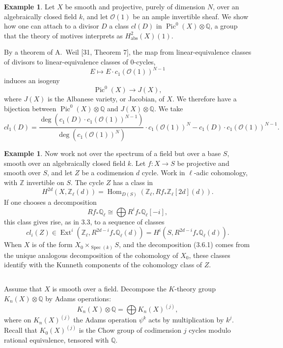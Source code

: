 \documentclass[11pt,a4paper]{article}
\theoremstyle{plain}
\theoremstyle{definition}
\newtheorem{example}[theorem]{Example}
\DeclareMathOperator{\Ext}{Ext}
\DeclareMathOperator{\Hom}{Hom}
\DeclareMathOperator{\Spec}{Spec}
\DeclareMathOperator{\Pic}{Pic}
\newcommand{\Q}{\mathbb{Q}}
\newcommand{\Z}{\mathbb{Z}}
\newcommand{\abs}{\mathrm{abs}}
\begin{document}
\begin{example}
Let $X$ be smooth and projective, purely of dimension $N$, over an algebraically closed field $k$, and let $\mathcal{O}(1)$ be an ample invertible sheaf. We show how one can attach to a divisor $D$ a class $cl(D)$ in $\Pic^0(X)\otimes\Q$, a group that the theory of motives interprets as $H^2_{\abs}(X)(1)$.

By a theorem of A.~Weil [31, Theorem 7], the map from linear-equivalence classes of divisors to linear-equivalence classes of $0$-cycles,
$$
E\mapsto E\cdot c_1(\mathcal{O}(1))^{N-1}
$$
induces an isogeny
$$
\Pic^0(X)\to J(X),
$$
where $J(X)$ is the Albanese variety, or Jacobian, of $X$. We therefore have a bijection between $\Pic^0(X)\otimes\Q$ and $J(X)\otimes\Q$. We take
$$
cl_1(D)=\frac{\deg(c_1(D)\cdot c_1(\mathcal{O}(1))^{N-1})}{\deg(c_1(\mathcal{O}(1))^N)}\cdot c_1(\mathcal{O}(1))^N-c_1(D)\cdot c_1(\mathcal{O}(1))^{N-1}.
$$
\end{example}

\begin{example}
Now work not over the spectrum of a field but over a base $S$, smooth over an algebraically closed field $k$. Let $f:X\to S$ be projective and smooth over $S$, and let $Z$ be a codimension $d$ cycle. Work in $\ell$-adic cohomology, with $\Z$ invertible on $S$. The cycle $Z$ has a class in
$$
H^{2d}(X,\Z_\ell(d))=\Hom_{D(S)}(\Z_\ell,Rf_*\Z_\ell[2d](d)).
$$
If one chooses a decomposition
\begin{equation}
\tag{3.6.1}
Rf_*\Q_\ell\cong\bigoplus R^i f_*\Q_\ell[-i],
\end{equation}
this class gives rise, as in 3.3, to a sequence of classes
\begin{equation}
\tag{3.6.2}
cl_i(Z)\in\Ext^i(\Z_\ell,R^{2d-i}f_*\Q_\ell(d))=H^i(S,R^{2d-i}f_*\Q_\ell(d)).
\end{equation}
When $X$ is of the form $X_0\times_{\Spec(k)}S$, and the decomposition (3.6.1) comes from the unique analogous decomposition of the cohomology of $X_0$, these classes identify with the Kunneth components of the cohomology class of $Z$.
\end{example}

\subsection{}

Assume that $X$ is smooth over a field. Decompose the $K$-theory group $K_n(X)\otimes\Q$ by Adams operations:
$$
K_n(X)\otimes\Q=\bigoplus K_n(X)^{(j)},
$$
where on $K_n(X)^{(j)}$ the Adams operation $\psi^k$ acts by multiplication by $k^j$. Recall that $K_0(X)^{(j)}$ is the Chow group of codimension $j$ cycles modulo rational equivalence, tensored with $\Q$.
\end{document}
